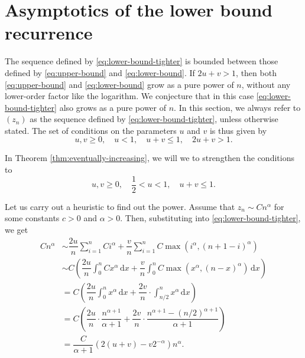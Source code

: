 \section{Asymptotics of the lower bound recurrence}


The sequence defined by \eqref{eq:lower-bound-tighter} is bounded between those defined by \eqref{eq:upper-bound} and \eqref{eq:lower-bound}. If $2u+v > 1$, then both \eqref{eq:upper-bound} and \eqref{eq:lower-bound} grow as a pure power of $n$, without any lower-order factor like the logarithm. We conjecture that in this case \eqref{eq:lower-bound-tighter} also grows as a pure power of $n$. In this section, we always refer to $(z_n)$ as the sequence defined by \eqref{eq:lower-bound-tighter}, unless otherwise stated. The set of conditions on the parameters $u$ and $v$ is thus given by
\begin{equation}
  \label{eq:parameter-conditions}
  u,v \ge 0, \quad u < 1, \quad u+v\le1, \quad 2u+v > 1.
\end{equation}

In Theorem \ref{thm:eventually-increasing}, we will we to strengthen the conditions to
\begin{equation}
  \label{eq:parameter-conditions-stronger}
  u,v \ge 0, \quad \dfrac{1}{2} < u < 1, \quad u+v\le1.
\end{equation}

Let us carry out a heuristic to find out the power. Assume that $z_n \sim Cn^{\alpha}$ for some constants $c > 0$ and $\alpha > 0$. Then, substituting into \eqref{eq:lower-bound-tighter}, we get
\begin{align*}
  Cn^\alpha
   & \sim \dfrac{2u}{n}\sum\limits_{i=1}^n C i^\alpha + \dfrac{v}{n}\sum\limits_{i=1}^n C\max\left(i^\alpha, (n+1-i)^\alpha\right)                   \\
   & \sim C\left( \dfrac{2u}{n}\int_0^n C x^\alpha\,\mathrm{d}x + \dfrac{v}{n}\int_0^n C\max\left(x^\alpha, (n-x)^\alpha\right) \,\mathrm{d}x\right) \\
   & = C\left(\dfrac{2u}{n}\int_0^n x^\alpha\,\mathrm{d}x + \dfrac{2v}{n}\cdot \int_{n/2}^{n} x^\alpha \,\mathrm{d}x\right)                          \\
   & = C\left(\dfrac{2u}{n}\cdot \dfrac{n^{\alpha+1}}{\alpha+1} + \dfrac{2v}{n}\cdot \dfrac{n^{\alpha+1}-(n/2)^{\alpha+1}}{\alpha+1}\right)          \\
   & = \dfrac{C}{\alpha+1}\left(2(u+v) - v2^{-\alpha}\right)n^{\alpha}.
\end{align*}

